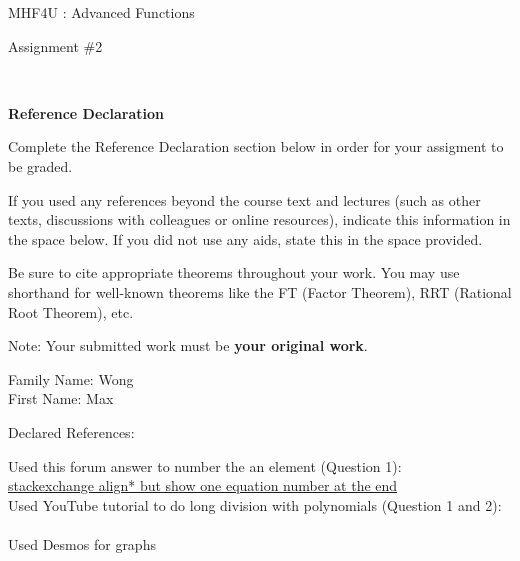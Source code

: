 \documentclass[12pt]{book}
\begin{document}
\vspace{-1.0in}\begin{center}
\Large{MHF4U : Advanced Functions }

\Large{Assignment \#2}


\end{center}


\vspace{0.015in}\hrulefill\ 

\textbf{Reference Declaration} %

Complete the Reference Declaration section below in order for your assigment to be graded.

If you used any references beyond the course text and lectures (such as other texts, discussions with colleagues or online resources), indicate this information in the space below.  If you did not use any aids, state this in the space provided. 

Be sure to cite appropriate theorems throughout your work. You may use shorthand for well-known theorems like the FT (Factor Theorem), RRT (Rational Root Theorem), etc. 

Note: Your submitted work must be \textbf{your original work}. 

Family Name: Wong\\%
First Name: Max%

Declared References: 

Used this forum answer to number the an element (Question 1): \\
\href{https://tex.stackexchange.com/questions/42726/align-but-show-one-equation-number-at-the-end}{stackexchange align* but show one equation number at the end} \\
Used YouTube tutorial to do long division with polynomials (Question 1 and 2): \\
\href{https://www.youtube.com/watch?v=9JfhV2Dimms} \\
Used Desmos for graphs


\vspace{0.015in}\hrulefill\ 

\newpage

\end{document}
